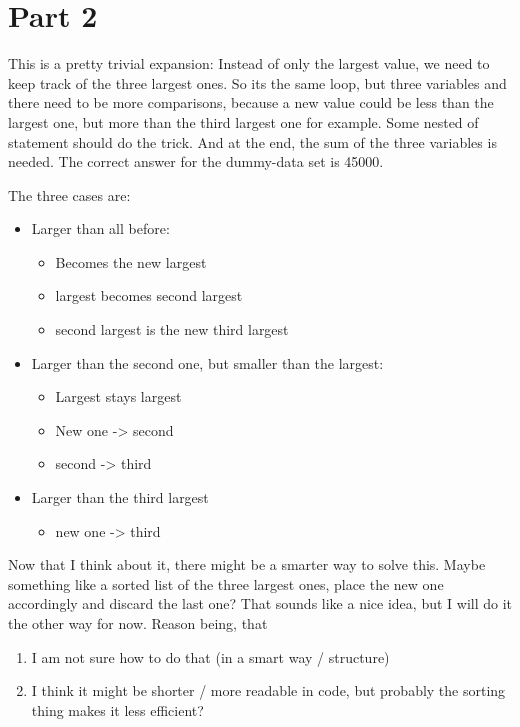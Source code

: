 \documentclass[11pt]{article}
\begin{document}
\section{Part 2}
\label{sec:org1eacb2f}
This is a pretty trivial expansion:
Instead of only the largest value, we need to keep track of the three largest ones.
So its the same loop, but three variables and there need to be more comparisons, because
a new value could be less than the largest one, but more than the third largest one for example.
Some nested of statement should do the trick.
And at the end, the sum of the three variables is needed.
The correct answer for the dummy-data set is 45000.

The three cases are:
\begin{itemize}
\item Larger than all before:
\begin{itemize}
\item Becomes the new largest
\item largest becomes second largest
\item second largest is the new third largest
\end{itemize}
\item Larger than the second one, but smaller than the largest:
\begin{itemize}
\item Largest stays largest
\item New one -> second
\item second -> third
\end{itemize}
\item Larger than the third largest
\begin{itemize}
\item new one -> third
\end{itemize}
\end{itemize}

Now that I think about it, there might be a smarter way to solve this.
Maybe something like a sorted list of the three largest ones, place the new one accordingly
and discard the last one?
That sounds like a nice idea, but I will do it the other way for now.
Reason being, that
\begin{enumerate}
\item I am not sure how to do that (in a smart way / structure)
\item I think it might be shorter / more readable in code, but probably the sorting thing makes it
less efficient?
\end{enumerate}
\end{document}
